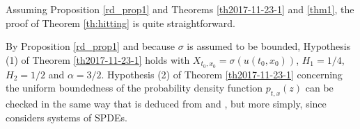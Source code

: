 \documentclass[12pt,a4paper]{article}
\newcommand{\HH}{\mathcal{H}}
\newcommand{\<}{\langle}
\renewcommand{\>}{\rangle}
\begin{document}
\medskip

 Assuming Proposition \ref{rd_prop1} and Theorems \ref{th2017-11-23-1} and \ref{thm1}, the proof of Theorem \ref{th:hitting} is quite straightforward.
 \medskip
 
  By Proposition \ref{rd_prop1} and because $\sigma$ is assumed to be bounded, Hypothesis (1) of Theorem \ref{th2017-11-23-1} holds with $X_{t_0, x_0} = \sigma(u(t_0,x_0))$, $H_1 = 1/4$, $H_2 = 1/2$ and $\alpha = 3/2$. Hypothesis (2) of Theorem \ref{th2017-11-23-1} concerning the uniform boundedness of the probability density function $p_{t, x}(z)$ can be checked in the same way that \cite[Corollary 4.3]{DKN09} is deduced from \cite[Proposition 4.1]{DKN09} and \cite[Proposition 4.2]{DKN09}, but more simply, since \cite{DKN09} considers systems of SPDEs.
 
 
\end{document}
